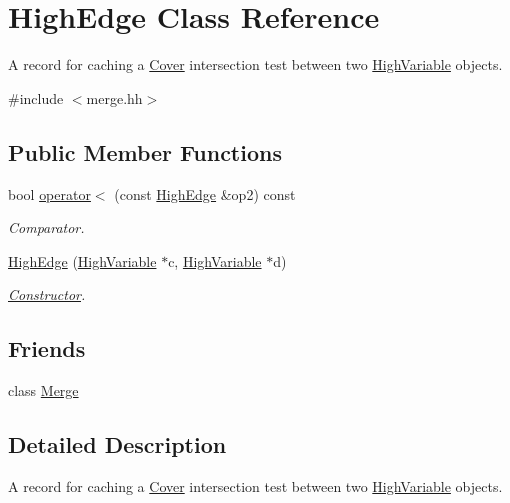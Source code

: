 \hypertarget{class_high_edge}{}\section{High\+Edge Class Reference}
\label{class_high_edge}


A record for caching a \mbox{\hyperlink{class_cover}{Cover}} intersection test between two \mbox{\hyperlink{class_high_variable}{High\+Variable}} objects.  




{\ttfamily \#include $<$merge.\+hh$>$}

\subsection*{Public Member Functions}
\begin{DoxyCompactItemize}
\item 
bool \mbox{\hyperlink{class_high_edge_ad4bffab9b5ea1beab4de1b0bd8b80469}{operator$<$}} (const \mbox{\hyperlink{class_high_edge}{High\+Edge}} \&op2) const
\begin{DoxyCompactList}\small\item\em Comparator. \end{DoxyCompactList}\item 
\mbox{\hyperlink{class_high_edge_a2783357a267565b606160dd2314d74c9}{High\+Edge}} (\mbox{\hyperlink{class_high_variable}{High\+Variable}} $\ast$c, \mbox{\hyperlink{class_high_variable}{High\+Variable}} $\ast$d)
\begin{DoxyCompactList}\small\item\em \mbox{\hyperlink{class_constructor}{Constructor}}. \end{DoxyCompactList}\end{DoxyCompactItemize}
\subsection*{Friends}
\begin{DoxyCompactItemize}
\item 
class \mbox{\hyperlink{class_high_edge_ada039d79291c7baead36ca12c2f1737b}{Merge}}
\end{DoxyCompactItemize}


\subsection{Detailed Description}
A record for caching a \mbox{\hyperlink{class_cover}{Cover}} intersection test between two \mbox{\hyperlink{class_high_variable}{High\+Variable}} objects. 

